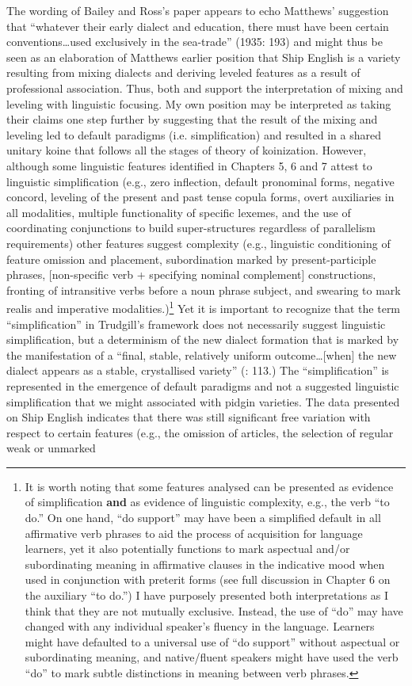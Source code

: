 The wording of Bailey and Ross’s paper appears to echo Matthews’ suggestion that “whatever their early dialect and education, there must have been certain conventions…used exclusively in the sea-trade” (1935: 193) and might thus be seen as an elaboration of Matthews earlier position that Ship English is a variety resulting from mixing dialects and deriving leveled features as a result of professional association. Thus, both  and \citet{BaileyRoss1988} support the interpretation of mixing and leveling with linguistic focusing. My own position may be interpreted as taking their claims one step further by suggesting that the result of the mixing and leveling led to default paradigms (i.e. simplification) and resulted in a shared unitary koine that follows all the stages of  theory of koinization. However, although some linguistic features identified in Chapters 5, 6 and 7 attest to linguistic simplification (e.g., zero inflection, default pronominal forms, negative concord, leveling of the present and past tense copula forms, overt auxiliaries in all modalities, multiple functionality of specific lexemes, and the use of coordinating conjunctions to build super-structures regardless of parallelism requirements) other features suggest complexity (e.g., linguistic conditioning of feature omission and placement, subordination marked by present-participle phrases, [non-specific verb + specifying nominal complement] constructions, fronting of intransitive verbs before a noun phrase subject, and swearing to mark realis and imperative modalities.)\footnote{It is worth noting that some features analysed can be presented as evidence of simplification \textbf{and} as evidence of linguistic complexity, e.g., the verb “to do.” On one hand, “do support” may have been a simplified default in all affirmative verb phrases to aid the process of acquisition for language learners, yet it also potentially functions to mark aspectual and/or subordinating meaning in affirmative clauses in the indicative mood when used in conjunction with preterit forms (see full discussion in Chapter 6 on the auxiliary “to do.”) I have purposely presented both interpretations as I think that they are not mutually exclusive. Instead, the use of “do” may have changed with any individual speaker’s fluency in the language. Learners might have defaulted to a universal use of “do support” without aspectual or subordinating meaning, and native/fluent speakers might have used the verb “do” to mark subtle distinctions in meaning between verb phrases.  } Yet it is important to recognize that the term “simplification” in Trudgill’s framework does not necessarily suggest linguistic simplification, but a determinism of the new dialect formation that is marked by the manifestation of a “final, stable, relatively uniform outcome…[when] the new dialect appears as a stable, crystallised variety” (\citealt{Trudgill2004}: 113.) The “simplification” is represented in the emergence of default paradigms and not a suggested linguistic simplification that we might associated with pidgin varieties. The data presented on Ship English indicates that there was still significant free variation with respect to certain features (e.g., the omission of articles, the selection of regular weak or unmarked 